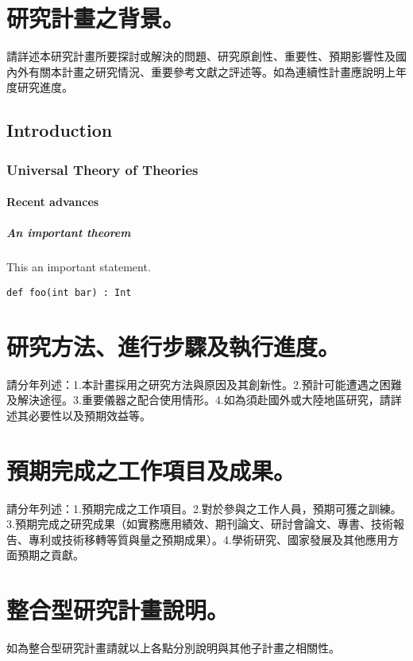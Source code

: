 \documentclass[libertine]{cm03}
\begin{document}
\section{研究計畫之背景。}
請詳述本研究計畫所要探討或解決的問題、研究原創性、重要性、預期影響性及國內外有關本計畫之研究情況、重要參考文獻之評述等。如為連續性計畫應說明上年度研究進度。

\subsection{Introduction}

\blindtext

\subsubsection{Universal Theory of Theories}

\blindtext

\paragraph{Recent advances}

\blindtext

\subparagraph{An important theorem}

\begin{theorem}
  This an important statement.
\end{theorem}

\texttt{def foo(int bar) : Int}
\section{研究方法、進行步驟及執行進度。}
請分年列述：1.本計畫採用之研究方法與原因及其創新性。2.預計可能遭遇之困難及解決途徑。3.重要儀器之配合使用情形。4.如為須赴國外或大陸地區研究，請詳述其必要性以及預期效益等。

\section{預期完成之工作項目及成果。}
請分年列述：1.預期完成之工作項目。2.對於參與之工作人員，預期可獲之訓練。3.預期完成之研究成果（如實務應用績效、期刊論文、研討會論文、專書、技術報告、專利或技術移轉等質與量之預期成果）。4.學術研究、國家發展及其他應用方面預期之貢獻。

\section{整合型研究計畫說明。}
如為整合型研究計畫請就以上各點分別說明與其他子計畫之相關性。

\nocite{greenwade93}



\end{document}
